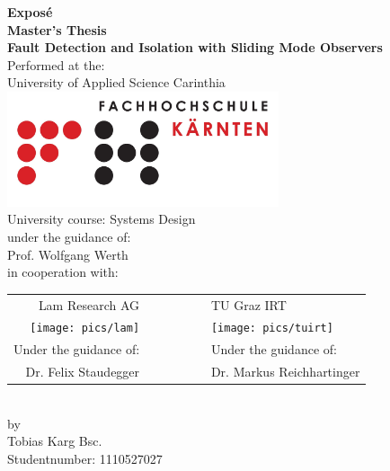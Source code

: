 \begin{titlepage}

\begin{center}

\textbf{\LARGE Exposé}\\[0.2cm]
\textbf{\LARGE Master's Thesis}\\[0.5cm]
\textbf{\LARGE Fault Detection and Isolation with Sliding Mode Observers}\\[1cm]

Performed at the:\\
\large University of Applied Science Carinthia 
\includegraphics[width=0.60\textwidth]{pics/fh_logo}\\[0.0cm]    
\large University course: Systems Design\\[1cm]
\small under the guidance of:\\
\large Prof. Wolfgang Werth\\
in cooperation with:\\[1cm]

\begin{tabular}{r l l}
	Lam Research AG & & TU Graz IRT\\
	\texttt{[image: pics/lam]} & $ \phantom{aaaaaaa}$ & \texttt{[image: pics/tuirt]}\\
	\small Under the guidance of: & & \small Under the guidance of:\\
	Dr. Felix Staudegger & & Dr. Markus Reichhartinger
\end{tabular}\\[1cm]
\normalsize
\large by\\[0.5cm]
Tobias Karg Bsc.\\[0.2cm]
Studentnumber: 1110527027\\[0.2cm]

\normalsize


\vfill


\end{center}

\end{titlepage}
